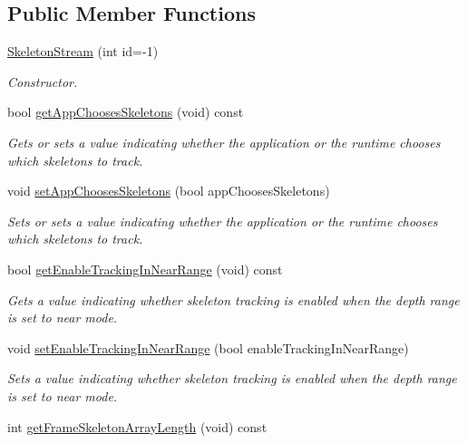 \subsection*{\-Public \-Member \-Functions}
\begin{DoxyCompactItemize}
\item 
\hyperlink{class_skeleton_stream_a2686e692f6cdee9db86fda04fbc84a60}{\-Skeleton\-Stream} (int id=-\/1)
\begin{DoxyCompactList}\small\item\em \-Constructor. \end{DoxyCompactList}\item 
bool \hyperlink{class_skeleton_stream_af0cb428efdfe65ab51c539352b019f1a}{get\-App\-Chooses\-Skeletons} (void) const 
\begin{DoxyCompactList}\small\item\em \-Gets or sets a value indicating whether the application or the runtime chooses which skeletons to track. \end{DoxyCompactList}\item 
void \hyperlink{class_skeleton_stream_a4152adc04d86656ff5d2ed8440045778}{set\-App\-Chooses\-Skeletons} (bool app\-Chooses\-Skeletons)
\begin{DoxyCompactList}\small\item\em \-Sets or sets a value indicating whether the application or the runtime chooses which skeletons to track. \end{DoxyCompactList}\item 
bool \hyperlink{class_skeleton_stream_a9c9c7f50cc87a923a28974797e0c21eb}{get\-Enable\-Tracking\-In\-Near\-Range} (void) const 
\begin{DoxyCompactList}\small\item\em \-Gets a value indicating whether skeleton tracking is enabled when the depth range is set to near mode. \end{DoxyCompactList}\item 
void \hyperlink{class_skeleton_stream_a1837078cfed89afe3e5a9c64ac773646}{set\-Enable\-Tracking\-In\-Near\-Range} (bool enable\-Tracking\-In\-Near\-Range)
\begin{DoxyCompactList}\small\item\em \-Sets a value indicating whether skeleton tracking is enabled when the depth range is set to near mode. \end{DoxyCompactList}\item 
int \hyperlink{class_skeleton_stream_a138912e8e8de6c127c47418c1a999f9f}{get\-Frame\-Skeleton\-Array\-Length} (void) const 

\end{DoxyCompactItemize}
